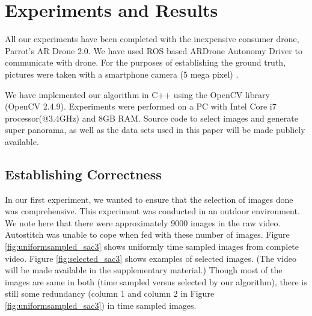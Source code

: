 \section{Experiments and Results}

All our experiments have been completed with the inexpensive consumer
drone, Parrot's AR Drone 2.0. We have used ROS based ARDrone Autonomy Driver
to communicate with drone. For the purposes of establishing the ground truth,
pictures were taken with a smartphone camera (5 mega pixel) .

We have implemented our algorithm in C++ using the OpenCV library (OpenCV
2.4.9). Experiments were performed on a PC with Intel Core i7 processor(@3.4GHz)
and 8GB RAM. Source code to select images and generate super panorama, as well as the
data sets used in this paper will be made publicly available.


\subsection{Establishing Correctness}

In our first experiment, we wanted to ensure that the selection of
images done was comprehensive.  This experiment was conducted in an
outdoor environment. We note here that there were approximately 9000 images in
the raw video.  Autostitch was unable to cope when fed with these number of images.  
Figure \ref{fig:uniformsampled_sac3} shows uniformly
time sampled images from complete video. Figure \ref{fig:selected_sac3}  shows
examples of selected images. (The video will be made available in the
supplementary material.) Though most of the images are same in both (time
sampled versus selected by our algorithm), there is still some redundancy
(column 1 and column 2 in Figure \ref{fig:uniformsampled_sac3}) in time sampled
images.


